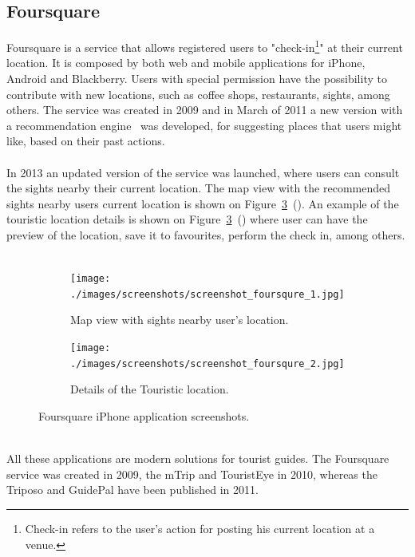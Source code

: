 \subsection{Foursquare}
Foursquare is a service that allows registered users to "check-in\footnote{Check-in refers to the user's action for posting his current location at a venue.}" at their current location. It is composed by both web and mobile applications for iPhone, Android and Blackberry. Users with special permission have the possibility to contribute with new locations, such as coffee shops, restaurants, sights, among others. The service was created in 2009 and in March of 2011 a new version with a recommendation engine~\cite{foursqureRecommendationEngine} was developed, for suggesting places that users might like, based on their past actions.\\
\\
In 2013 an updated version of the service was launched, where users can consult the sights nearby their current location. The map view with the recommended sights nearby users current location is shown on Figure~\ref{fig:4SqureScreenshots}~(). An example of the touristic location details is shown on Figure~\ref{fig:4SqureScreenshots}~() where user can have the preview of the location, save it to favourites, perform the check in, among others.\\
\\
\begin{figure}
        \centering
        \begin{subfigure}[b]{0.25\textwidth}
                \centering
                \texttt{[image: ./images/screenshots/screenshot\_foursqure\_1.jpg]}
                \caption{Map view with sights nearby user's location.}
                \label{fig:4squre2}
        \end{subfigure}%
        \quad\quad\quad\quad\quad
        \begin{subfigure}[b]{0.25\textwidth}
                \centering
                \texttt{[image: ./images/screenshots/screenshot\_foursqure\_2.jpg]}
                \caption{Details of the Touristic location.}
                \label{fig:4squre3}
        \end{subfigure}%
        \caption{Foursquare iPhone application screenshots.}
        \label{fig:4SqureScreenshots}
\end{figure}
\\
All these applications are modern solutions for tourist guides. The Foursquare service was created in 2009, the mTrip and TouristEye in 2010, whereas the Triposo and GuidePal have been published in 2011. 
\newpage

